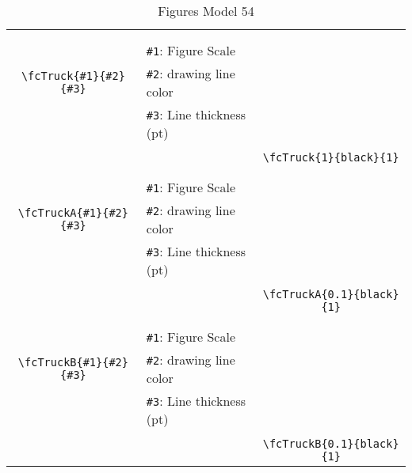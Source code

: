 \documentclass[x11names]{article}
\begin{document}
\begin{table}[H]
\begin{tabular}{|c|l|c|}
	&&\multirow{5}{*}{\fcTruck{1}{black}{1}}\\	&&\\	&\verb|#1|: Figure Scale &\\	\verb|\fcTruck{#1}{#2}{#3}|&	\verb|#2|: drawing line color &\\	&\verb|#3|: Line thickness (pt) &\\ &&\\&&	\verb|\fcTruck{1}{black}{1}|\\\hline 	
	&&\multirow{5}{*}{\fcTruckA{0.1}{black}{1}}\\	&&\\	&\verb|#1|: Figure Scale &\\	\verb|\fcTruckA{#1}{#2}{#3}|&	\verb|#2|: drawing line color &\\	&\verb|#3|: Line thickness (pt) &\\ &&\\&&	\verb|\fcTruckA{0.1}{black}{1}|\\\hline 	
	&&\multirow{5}{*}{\fcTruckB{0.1}{black}{1}}\\	&&\\	&\verb|#1|: Figure Scale &\\	\verb|\fcTruckB{#1}{#2}{#3}|&	\verb|#2|: drawing line color &\\	&\verb|#3|: Line thickness (pt) &\\ &&\\&&	\verb|\fcTruckB{0.1}{black}{1}|\\\hline 	\hline\end{tabular}\caption{Figures Model 54}\label{tab54}\end{table}
\end{document}
